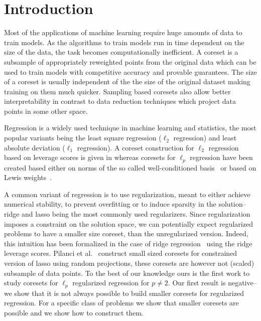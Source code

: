 \section{Introduction}
Most of the applications of machine learning require huge amounts of data to train models. As the algorithms to train models run in time dependent on the size of the data, the task becomes computationally inefficient. A coreset is a subsample of appropriately reweighted points from the original data which can be used to train models with competitive accuracy and provable guarantees. The size of a coreset is usually independent of the the size of the original dataset making training on them much quicker. Sampling based coresets also allow better interpretability in contrast to data reduction techniques which project data points in some other space.

Regression is a widely used technique in machine learning and statistics, the most popular variants being the least square regression ($\ell_2$ regression) and least absolute deviation ($\ell_1$ regression).  A coreset construction for $\ell_2$ regression based on leverage scores is given in \cite{drineas2006sampling} whereas coresets for $\ell_p$ regression have been created based either on norms of the so called well-conditioned basis~\cite{dasgupta2009sampling,sohler2011subspace} or based on Lewis weights~\cite{cohen2015p}.

A common variant of regression is to use regularization, meant to either achieve numerical stability, to prevent overfitting or to induce sparsity in the solution-- ridge and lasso being the most commonly used regularizers. Since regularization imposes a constraint on the solution space, we can potentially expect regularized problems to have a smaller size coreset, than the unregularized version. Indeed, this intuition has been formalized in the case of ridge regression~\cite{woodruff2014sketching} using the ridge leverage scores. Pilanci et al.~\cite{pilanci2015randomized} construct small sized coresets for constrained version of lasso using random projections, these coresets are however not (scaled) subsample of data points. To the best of our knowledge ours is the first work to study coresets for $\ell_p$ regularized regression for $p\neq 2$. Our first result is negative-- we show that 
it is not always possible to build smaller coresets for regularized regression. For a specific class of problems we show that smaller coresets are possible and we show how to construct them.

